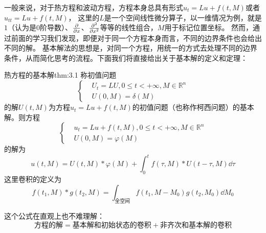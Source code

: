 一般来说，对于热方程和波动方程，方程本身总具有形式$u_t = Lu + f(t, M)$或者$u_{tt} = Lu + f(t, M)$，
这里的$L$是一个空间线性微分算子，以一维情况为例，就是$1$（认为是$0$阶导数）、$\pdv{}{x}$、$\pdv[2]{}{x}$等等的线性组合，$M$用于标记位置坐标。
然而，通过前面的学习我们发现，即便对于同一个方程本身而言，不同的边界条件也会给出不同的解。
基本解法的思想是，对同一个方程，用统一的方式去处理不同的边界条件，从而简化思考的流程。下面我们将直接给出关于基本解的定义和定理：
\begin{theorem}{热方程的基本解}{thm:3.1}
    称初值问题
    \begin{equation*}
        \left\{
            \begin{aligned}
                &U_{t} = LU, 0 \leq t < +\infty, M \in \mathbb{R}^n\\
                &U(0, M) = \delta(M)
            \end{aligned}
        \right.
    \end{equation*}
    的解$U(t, M)$为方程$u_t = Lu + f(t, M)$的初值问题（也称作柯西问题）的基本解。则方程
    \begin{equation*}
        \left\{
            \begin{aligned}
                &u_t = Lu + f(t, M), 0 \leq t < +\infty, M \in \mathbb{R}^n\\
                &U(0, M) = \varphi(M)
            \end{aligned}
        \right.
    \end{equation*}
    的解为
    \[u(t, M) = U(t, M) * \varphi(M) + \int_{0}^{t} f(\tau, M) * U(t - \tau, M) \dd{\tau}\]
    这里卷积的定义为
    \[f(t_1, M) * g(t_2, M) = \int_{\text{全空间}} f(t_1, M - M_0) g(t_2, M_0) \dd{M_0}\]
\end{theorem}
这个公式在直观上也不难理解：
\[\text{方程的解} = \text{基本解和初始状态的卷积} + \text{非齐次和基本解的卷积}\]
